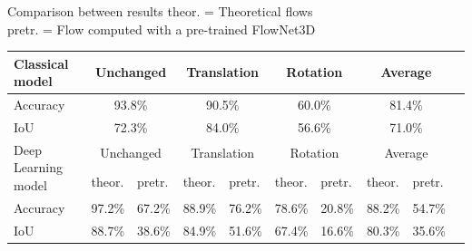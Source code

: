 \documentclass{beamer}
\begin{document}
\begin{frame}{Comparison between results}
theor. = Theoretical flows\\
pretr. = Flow computed with a pre-trained FlowNet3D
\begin{table}
  \begin{tabular}{|l|l|l|l|l|l|l|l|l|l|}
    \hline

    Classical model &
      \multicolumn{2}{c|}{Unchanged} &
      \multicolumn{2}{c|}{Translation} &
      \multicolumn{2}{c|}{Rotation} &
      \multicolumn{2}{c|}{Average} \\ \hline
    Accuracy &
      \multicolumn{2}{c|}{93.8\%} &
      \multicolumn{2}{c|}{90.5\%} &
      \multicolumn{2}{c|}{60.0\%} &
      \multicolumn{2}{c|}{81.4\%} \\ \hline
    IoU &
      \multicolumn{2}{c|}{72.3\%} &
      \multicolumn{2}{c|}{84.0\%} &
      \multicolumn{2}{c|}{56.6\%} &
      \multicolumn{2}{c|}{71.0\%} \\ \hline \hline
    \multirow{2}{*}{Deep Learning model} &
      \multicolumn{2}{c}{Unchanged} &
      \multicolumn{2}{c}{Translation} &
      \multicolumn{2}{c}{Rotation} &
      \multicolumn{2}{c|}{Average} \\
    & theor. & pretr. & theor. & pretr. & theor. & pretr. & theor. & pretr. \\
    \hline
    Accuracy & 97.2\% & 67.2\% & 88.9\% & 76.2\% & 78.6\% & 20.8\% & 88.2\% & 54.7\% \\
    \hline
    IoU &      88.7\% & 38.6\% & 84.9\% & 51.6\% & 67.4\% & 16.6\% & 80.3\% & 35.6\%\\ \hline
  \end{tabular}
\end{table}
\end{frame}
\end{document}
